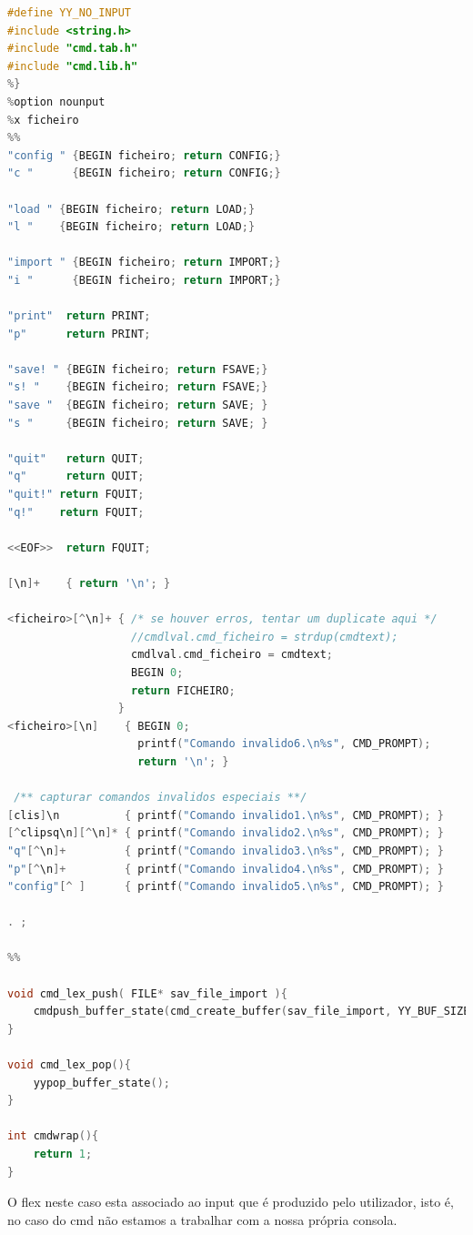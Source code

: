 \documentclass[11pt, a4paper, oneside]{article}
\begin{document}
\begin{lstlisting}[language=C, caption={LEX do ficheiro cmd.}]
%{
#define YY_NO_INPUT
#include <string.h>
#include "cmd.tab.h"
#include "cmd.lib.h"
%}
%option nounput
%x ficheiro
%%
"config " {BEGIN ficheiro; return CONFIG;}
"c "      {BEGIN ficheiro; return CONFIG;}

"load " {BEGIN ficheiro; return LOAD;}
"l "    {BEGIN ficheiro; return LOAD;}

"import " {BEGIN ficheiro; return IMPORT;}
"i "      {BEGIN ficheiro; return IMPORT;}

"print"  return PRINT;
"p"      return PRINT;

"save! " {BEGIN ficheiro; return FSAVE;}
"s! "    {BEGIN ficheiro; return FSAVE;}
"save "  {BEGIN ficheiro; return SAVE; }
"s "     {BEGIN ficheiro; return SAVE; }

"quit"   return QUIT;
"q"      return QUIT;
"quit!" return FQUIT;
"q!"    return FQUIT;

<<EOF>>  return FQUIT;

[\n]+    { return '\n'; }

<ficheiro>[^\n]+ { /* se houver erros, tentar um duplicate aqui */
                   //cmdlval.cmd_ficheiro = strdup(cmdtext);
                   cmdlval.cmd_ficheiro = cmdtext;
                   BEGIN 0;
                   return FICHEIRO;
                 }
<ficheiro>[\n]    { BEGIN 0;
                    printf("Comando invalido6.\n%s", CMD_PROMPT);
                    return '\n'; }

 /** capturar comandos invalidos especiais **/
[clis]\n          { printf("Comando invalido1.\n%s", CMD_PROMPT); }
[^clipsq\n][^\n]* { printf("Comando invalido2.\n%s", CMD_PROMPT); }
"q"[^\n]+         { printf("Comando invalido3.\n%s", CMD_PROMPT); }
"p"[^\n]+         { printf("Comando invalido4.\n%s", CMD_PROMPT); }
"config"[^ ]      { printf("Comando invalido5.\n%s", CMD_PROMPT); }

. ;

%%

void cmd_lex_push( FILE* sav_file_import ){
    cmdpush_buffer_state(cmd_create_buffer(sav_file_import, YY_BUF_SIZE));
}

void cmd_lex_pop(){
    yypop_buffer_state();
}

int cmdwrap(){
    return 1;
}
\end{lstlisting}

O flex neste caso esta associado ao input que é produzido pelo utilizador, isto é, no caso do cmd não estamos a trabalhar com a nossa própria consola.
\end{document}
